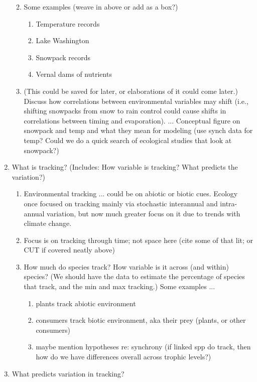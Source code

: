 \documentclass[11pt,letterpaper]{article}
\begin{document}
\begin{enumerate}
\begin{enumerate}
\begin{enumerate}
\end{enumerate}
\item Some examples (weave in above or add as a box?)
\begin{enumerate}
\item Temperature records
\item Lake Washington 
\item Snowpack records 
\item Vernal dams of nutrients
\end{enumerate}
\item (This could be saved for later, or elaborations of it could come later.) Discuss how correlations between environmental variables may shift (i.e., shifting snowpacks from snow to rain control could cause shifts in correlations between timing and evaporation). ... Conceptual figure on snowpack and temp and what they mean for modeling (use synch data for temp? Could we do a quick search of ecological studies that look at snowpack?) 
\end{enumerate}
\item What is tracking? (Includes: How variable is tracking? What predicts the variation?)
\begin{enumerate}
\item Environmental tracking ... could be on abiotic or biotic cues. Ecology once focused on tracking mainly via stochastic interannual and intra-annual variation, but now much greater focus on it due to trends with climate change. 
\item Focus is on tracking through time; not space here (cite some of that lit; or CUT if covered neatly above)
\item How much do species track? How variable is it across (and within) species? (We should have the data to estimate the
percentage of species that track, and the min and max tracking.) Some examples ...
\begin{enumerate}
\item plants track abiotic environment 
\item consumers track biotic environment, aka their prey (plants, or other consumers)
\item maybe mention hypotheses re: synchrony (if linked spp do track, then how do we have differences overall across trophic levels?)
\end{enumerate}
\end{enumerate}
\item What predicts variation in tracking?
\begin{enumerate}

\end{enumerate}
\end{enumerate}
\end{document}

